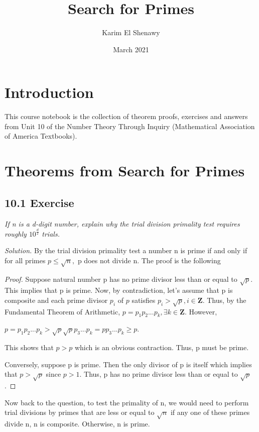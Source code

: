 \documentclass{article}
\title{Search for Primes}
\author{Karim El Shenawy}
\date{March 2021}
\begin{document}
\maketitle

\section*{Introduction}
This course notebook is the collection of theorem proofs, exercises and answers from Unit 10 of the Number Theory Through Inquiry (Mathematical Association of America Textbooks).

\section*{Theorems from Search for Primes}

\subsection*{10.1 Exercise} 
\quad \textit{If n is a d-digit number, explain why the trial division primality test requires roughly $10^{\frac{d}{2}}$ trials.}

\textit{Solution.} By the trial division primality test a number n is prime if and only if for all primes $p \leq \sqrt{n},$ p does not divide n. The proof is the following

\begin{proof}
Suppose natural number p has no prime divisor less than or equal to $\sqrt{p}$. This implies that p is prime. Now, by contradiction, let's assume that p is composite and each prime divisor $p_i$ of $p$ satisfies $p_i > \sqrt{p}, i \in \mathbf{Z}$. Thus, by the Fundamental Theorem of Arithmetic, $p = p_1p_2...p_k, \exists k \in \mathbf{Z}$. However,
\begin{center}
    $p = p_1p_2...p_k > \sqrt{p}\sqrt{p}p_3...p_k = pp_3...p_k \geq p$.
\end{center}
This shows that $p > p$ which is an obvious contraction. Thus, p must be prime.

Conversely, suppose p is prime. Then the only divisor of p is itself which implies that $p > \sqrt{p}$ since $p  > 1$. Thus, p has no prime divisor less than or equal to $\sqrt{p}$.
\end{proof}

Now back to the question, to test the primality of n, we would need to perform trial divisions by primes that are less or equal to $\sqrt{n}$ if any one of these primes divide n, n is composite. Otherwise, n is prime.\\
\end{document}
